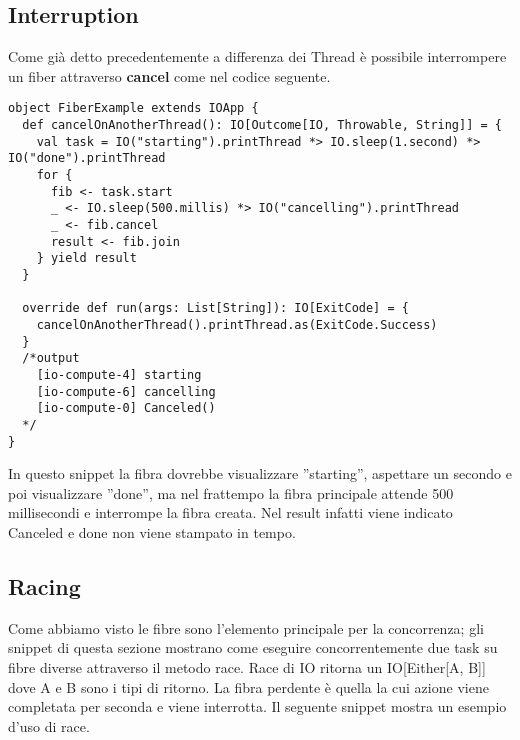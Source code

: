 \subsection{Interruption}
Come già detto precedentemente a differenza dei Thread è possibile interrompere un fiber attraverso \textbf{cancel} come nel codice seguente.

\begin{verbatim}
object FiberExample extends IOApp {
  def cancelOnAnotherThread(): IO[Outcome[IO, Throwable, String]] = {
    val task = IO("starting").printThread *> IO.sleep(1.second) *> IO("done").printThread
    for {
      fib <- task.start
      _ <- IO.sleep(500.millis) *> IO("cancelling").printThread
      _ <- fib.cancel
      result <- fib.join
    } yield result
  }
  
  override def run(args: List[String]): IO[ExitCode] = {
    cancelOnAnotherThread().printThread.as(ExitCode.Success) 
  }
  /*output
    [io-compute-4] starting
    [io-compute-6] cancelling
    [io-compute-0] Canceled()
  */
}
\end{verbatim}

\noindent In questo snippet la fibra dovrebbe visualizzare ”starting”, aspettare un secondo e poi visualizzare ”done”, ma nel frattempo la fibra  principale attende 500 millisecondi e interrompe la fibra creata. Nel result infatti viene indicato Canceled e done non viene stampato in tempo. 

\subsection{Racing}
Come abbiamo visto le fibre sono l'elemento principale per la concorrenza; gli snippet di questa sezione mostrano come eseguire concorrentemente due task su fibre diverse attraverso il metodo race. Race di IO ritorna un IO[Either[A, B]] dove A e B
sono i tipi di ritorno. La fibra perdente è quella la cui azione viene completata per seconda e viene interrotta. Il seguente snippet mostra un esempio d'uso di race.

